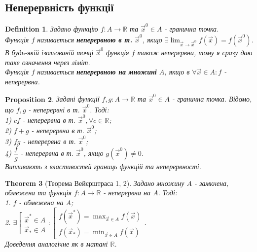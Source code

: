 \documentclass[a4paper, 10pt]{article}
\def\huge{\displaystyle}
\theoremstyle{theoremdd}
\newtheorem{theorem}{Theorem}[subsection]
\theoremstyle{theoremdd}
\newtheorem{definition}[theorem]{Definition}
\theoremstyle{theoremdd}
\theoremstyle{theoremdd}
\theoremstyle{theoremdd}
\newtheorem{proposition}[theorem]{Proposition}
\theoremstyle{theoremdd}
\theoremstyle{theoremdd}
\theoremstyle{theoremdd}
\begin{document}
\subsection{Неперервність функції}
\begin{definition}
Задано функцію $f: A \to \mathbb{R}$ та $\vec{x}^0 \in A$ - гранична точка.\\
Функція $f$ називається \textbf{неперервною в т.} $\vec{x}^0$, якщо $\exists \huge \lim_{\vec{x} \to \vec{x}^0} f(\vec{x}) = f(\vec{x}^0)$. В будь-якій ізольованій точці $\vec{x}^0$ функція $f$ також неперервна, тому я сразу даю таке означення через ліміт.\\
Функція $f$ називається \textbf{неперервною на множині} $A$, якщо в $\forall \vec{x} \in A: f$ - неперервна.
\end{definition}

\begin{proposition}
Задані функції $f,g: A \to \mathbb{R}$ та $\vec{x}^0 \in A$ - гранична точка. Відомо, що $f,g$ - неперервні в т. $\vec{x}^0$. Тоді:\\
1) $cf$ - неперервна в т. $\vec{x}^0, \forall c \in \mathbb{R}$;\\
2) $f+g$ - неперервна в т. $\vec{x}^0$;\\
3) $fg$ - неперервна в т. $\vec{x}^0$;\\
4) $\dfrac{f}{g}$ - неперервна в т. $\vec{x}^0$, якщо $g(\vec{x}^0) \neq 0$.\\
\textit{Випливають з властивостей границь функцій та неперервності.}
\end{proposition}

\begin{theorem}[Теорема Вейєрштраса 1, 2]
Задано множину $A$ - замкнена, обмежена та функція $f: A \to \mathbb{R}$ - неперервна на $A$. Тоді:\\
1. $f$ - обмежена на $A$;\\
2. $\exists \left[ \begin{gathered} \vec{x}^* \in A \\ \vec{x}_* \in A \end{gathered} \right. : \left[ \begin{gathered} f(\vec{x}^*) = \max_{\vec{x} \in A} f(\vec{x}) \\ f(\vec{x}_*) = \min_{\vec{x} \in A} f(\vec{x}) \end{gathered} \right.$.\\
\textit{Доведення аналогічне як в матані $\mathbb{R}$.}
\end{theorem}
\end{document}
